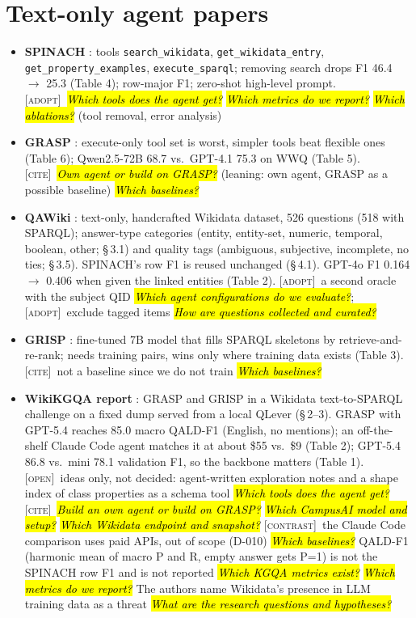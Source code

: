 \documentclass[10pt,a4paper]{article}
\newcommand{\adopt}{\textsc{[adopt]}}
\newcommand{\contrast}{\textsc{[contrast]}}
\newcommand{\cit}{\textsc{[cite]}}
\newcommand{\open}{\textsc{[open]}}
\newcommand{\q}[1]{\hl{\footnotesize\itshape #1}}
\begin{document}
\section{Text-only agent papers}
\begin{itemize}
  \item \textbf{SPINACH} \cite{liu2024spinach}: tools
    \texttt{search\_wikidata}, \texttt{get\_wikidata\_entry},
    \texttt{get\_property\_examples}, \texttt{execute\_sparql};
    removing search drops F1 46.4 $\to$ 25.3 (Table 4); row-major F1;
    zero-shot high-level prompt. \adopt\ \q{Which tools does the
    agent get?} \q{Which metrics do we report?} \q{Which ablations?}
    (tool removal, error analysis)
  \item \textbf{GRASP} \cite{walter2025grasp}: execute-only tool set
    is worst, simpler tools beat flexible ones (Table 6); Qwen2.5-72B
    68.7 vs.\ GPT-4.1 75.3 on WWQ (Table 5). \cit\ \q{Own agent or
    build on GRASP?} (leaning: own agent, GRASP as a possible baseline)
    \q{Which baselines?}
  \item \textbf{QAWiki} \cite{loustaunau2025qawiki}: text-only,
    handcrafted Wikidata dataset, 526 questions (518 with SPARQL);
    answer-type categories (entity, entity-set, numeric, temporal,
    boolean, other; \S\,3.1) and quality tags (ambiguous, subjective,
    incomplete, no ties; \S\,3.5). SPINACH's row F1 is reused
    unchanged (\S\,4.1). GPT-4o F1 0.164 $\to$ 0.406 when given the
    linked entities (Table 2). \adopt\ a second oracle with the
    subject QID \q{Which agent configurations do we evaluate?};
    \adopt\ exclude tagged items \q{How are questions collected and curated?}
  \item \textbf{GRISP} \cite{walter2026grisp}: fine-tuned 7B model
    that fills SPARQL skeletons by retrieve-and-re-rank; needs training
    pairs, wins only where training data exists (Table 3). \cit\ not a
    baseline since we do not train \q{Which baselines?}
  \item \textbf{WikiKGQA report} \cite{walter2026grasp}: GRASP and
    GRISP in a Wikidata text-to-SPARQL challenge on a fixed dump served
    from a local QLever (\S\,2--3). GRASP with GPT-5.4 reaches 85.0
    macro QALD-F1 (English, no mentions); an off-the-shelf Claude Code
    agent matches it at about \$55 vs.\ \$9 (Table 2); GPT-5.4 86.8
    vs.\ mini 78.1 validation F1, so the backbone matters (Table 1).
    \open\ ideas only, not decided: agent-written exploration notes and a shape
    index of class properties as a schema tool \q{Which tools does the
    agent get?} \cit\ \q{Build an own agent or build on GRASP?}
    \q{Which CampusAI model and setup?} \q{Which Wikidata endpoint and
    snapshot?} \contrast\ the Claude Code comparison uses paid APIs,
    out of scope (D-010) \q{Which baselines?} QALD-F1 (harmonic mean
      of macro P and R, empty answer
    gets P=1) is not the SPINACH row F1 and is not reported
    \q{Which KGQA metrics exist?} \q{Which metrics do we report?}
    The authors name Wikidata's presence in LLM training data as a
    threat \q{What are the research questions and hypotheses?}
\end{itemize}
\end{document}

